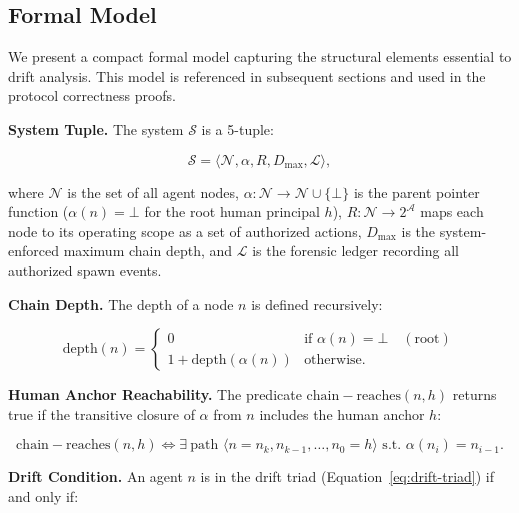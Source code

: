\subsection{Formal Model}
\label{sec:drift-model}

We present a compact formal model capturing the structural elements essential to drift analysis. This model is referenced in subsequent sections and used in the protocol correctness proofs.

\medskip
\noindent\textbf{System Tuple.}
The system $\mathcal{S}$ is a 5-tuple:

\begin{equation}
\mathcal{S} = \langle \mathcal{N}, \alpha, R, D_{\max}, \mathcal{L} \rangle,
\label{eq:system-model}
\end{equation}

where $\mathcal{N}$ is the set of all agent nodes, $\alpha: \mathcal{N} \rightarrow \mathcal{N} \cup \{\bot\}$ is the parent pointer function ($\alpha(n) = \bot$ for the root human principal $h$), $R: \mathcal{N} \rightarrow 2^{\mathcal{A}}$ maps each node to its operating scope as a set of authorized actions, $D_{\max}$ is the system-enforced maximum chain depth, and $\mathcal{L}$ is the forensic ledger recording all authorized spawn events.

\medskip
\noindent\textbf{Chain Depth.}
The depth of a node $n$ is defined recursively:

\begin{equation}
\mathrm{depth}(n) =
\begin{cases}
0 & \text{if } \alpha(n) = \bot \quad (\text{root}) \\
1 + \mathrm{depth}(\alpha(n)) & \text{otherwise}.
\end{cases}
\label{eq:depth}
\end{equation}

\medskip
\noindent\textbf{Human Anchor Reachability.}
The predicate $\mathrm{chain-reaches}(n, h)$ returns true if the transitive closure of $\alpha$ from $n$ includes the human anchor $h$:

\begin{equation}
\mathrm{chain-reaches}(n, h) \iff \exists\ \text{path } \langle n = n_k, n_{k-1}, \ldots, n_0 = h \rangle \text{ s.t. } \alpha(n_i) = n_{i-1}.
\label{eq:chain-reaches}
\end{equation}

\medskip
\noindent\textbf{Drift Condition.}
An agent $n$ is in the drift triad (Equation~\ref{eq:drift-triad}) if and only if:

